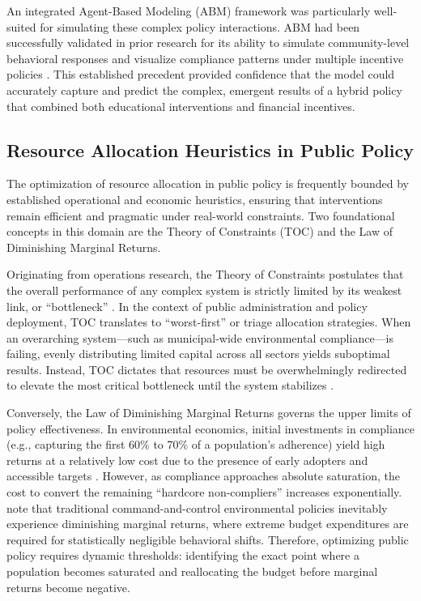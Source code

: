 An integrated Agent-Based Modeling (ABM) framework was particularly well-suited for simulating these complex policy interactions. ABM had been successfully validated in prior research for its ability to simulate community-level behavioral responses and visualize compliance patterns under multiple incentive policies \citep{Ma2023}. This established precedent provided confidence that the model could accurately capture and predict the complex, emergent results of a hybrid policy that combined both educational interventions and financial incentives.

\subsection{Resource Allocation Heuristics in Public Policy}
\setlength{\parindent}{2em}
The optimization of resource allocation in public policy is frequently bounded by established operational and economic heuristics, ensuring that interventions remain efficient and pragmatic under real-world constraints. Two foundational concepts in this domain are the Theory of Constraints (TOC) and the Law of Diminishing Marginal Returns.

Originating from operations research, the Theory of Constraints postulates that the overall performance of any complex system is strictly limited by its weakest link, or ``bottleneck'' \citep{Goldratt1984}. In the context of public administration and policy deployment, TOC translates to ``worst-first'' or triage allocation strategies. When an overarching system---such as municipal-wide environmental compliance---is failing, evenly distributing limited capital across all sectors yields suboptimal results. Instead, TOC dictates that resources must be overwhelmingly redirected to elevate the most critical bottleneck until the system stabilizes \citep{Umble2006}.

Conversely, the Law of Diminishing Marginal Returns governs the upper limits of policy effectiveness. In environmental economics, initial investments in compliance (e.g., capturing the first 60\% to 70\% of a population's adherence) yield high returns at a relatively low cost due to the presence of early adopters and accessible targets \citep{Tietenberg2018}. However, as compliance approaches absolute saturation, the cost to convert the remaining ``hardcore non-compliers'' increases exponentially. \citet{Rondinelli2000} note that traditional command-and-control environmental policies inevitably experience diminishing marginal returns, where extreme budget expenditures are required for statistically negligible behavioral shifts. Therefore, optimizing public policy requires dynamic thresholds: identifying the exact point where a population becomes saturated and reallocating the budget before marginal returns become negative.